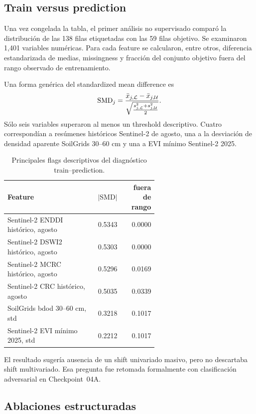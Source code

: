 \subsection{Train versus prediction}

Una vez congelada la tabla, el primer análisis no supervisado comparó la distribución de las
138 filas etiquetadas con las 59 filas objetivo. Se examinaron 1,401 variables numéricas. Para
cada feature se calcularon, entre otros, diferencia estandarizada de medias, missingness y
fracción del conjunto objetivo fuera del rango observado de entrenamiento.

Una forma genérica del standardized mean difference es
\begin{equation}
\mathrm{SMD}_j
=
\frac{\bar x_{j,\mathcal{L}}-\bar x_{j,\mathcal{U}}}
{\sqrt{\frac{s^2_{j,\mathcal{L}}+s^2_{j,\mathcal{U}}}{2}}}.
\label{eq:smd}
\end{equation}
Sólo seis variables superaron al menos un threshold descriptivo. Cuatro correspondían a
resúmenes históricos Sentinel-2 de agosto, una a la desviación de densidad aparente
SoilGrids 30--60 cm y una a EVI mínimo Sentinel-2 2025.

\begin{table}[H]
\centering
\caption{Principales flags descriptivos del diagnóstico train--prediction.}
\label{tab:cp02-shift}
\small
\begin{tabular}{p{0.60\linewidth}rr}
\toprule
Feature & $|\mathrm{SMD}|$ & fuera de rango \\
\midrule
Sentinel-2 ENDDI histórico, agosto & 0.5343 & 0.0000 \\
Sentinel-2 DSWI2 histórico, agosto & 0.5303 & 0.0000 \\
Sentinel-2 MCRC histórico, agosto & 0.5296 & 0.0169 \\
Sentinel-2 CRC histórico, agosto & 0.5035 & 0.0339 \\
SoilGrids bdod 30--60 cm, std & 0.3218 & 0.1017 \\
Sentinel-2 EVI mínimo 2025, std & 0.2212 & 0.1017 \\
\bottomrule
\end{tabular}
\end{table}

El resultado sugería ausencia de un shift univariado masivo, pero no descartaba shift
multivariado. Esa pregunta fue retomada formalmente con clasificación adversarial en
Checkpoint~04A.

\subsection{Ablaciones estructuradas}

